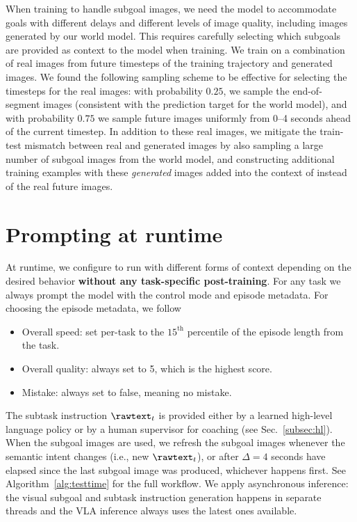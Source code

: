  
When training \MethodName{} to handle subgoal images, we need the model to accommodate goals with different delays and different levels of image quality, including images generated by our world model. This requires carefully selecting which subgoals are provided as context to the model when training. We train on a combination of real images from future timesteps of the training trajectory and generated images. We found the following sampling scheme to be effective for selecting the timesteps for the real images:
with probability $0.25$, we sample the end-of-segment images (consistent with the prediction target for the world model), and with probability $0.75$ we sample future images uniformly from 0--4 seconds ahead of the current timestep. In addition to these real images, we mitigate the train-test mismatch between real and generated images by also sampling a large number of subgoal images from the world model, and constructing additional training examples with these \emph{generated} images added into the context of \MethodName{} instead of the real future images.








\section{Prompting \texorpdfstring{\MethodName{}}{pi0.7} at runtime}
\label{sec:runtime}

At runtime, we configure \MethodName{} to run with different forms of context depending on the desired behavior \textbf{without any task-specific post-training}. For any task we always prompt the model with the control mode and episode metadata. 
For choosing the episode metadata, we follow
\begin{itemize}[leftmargin=10pt]
    \item Overall speed: set per-task to the $15^\text{th}$ percentile of the episode length from the task.
    \item Overall quality: always set to 5, which is the highest score.
    \item Mistake: always set to false, meaning no mistake.
\end{itemize}
The subtask instruction $\rawtext_t$ is provided either by a learned high-level language policy or by a human supervisor for coaching (see Sec.~\ref{subsec:hl}).
When the subgoal images are used, we refresh the subgoal images whenever the semantic intent changes (i.e., new $\rawtext_t$), or after $\Delta=4$ seconds have elapsed since the last subgoal image was produced, whichever happens first. See Algorithm~\ref{alg:testtime} for the full workflow. We apply asynchronous inference: the visual subgoal and subtask instruction generation happens in separate threads and the VLA inference always uses the latest ones available.

